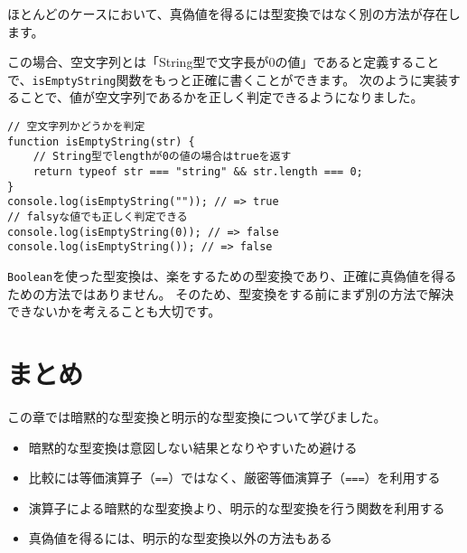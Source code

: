 ほとんどのケースにおいて、真偽値を得るには型変換ではなく別の方法が存在します。

この場合、空文字列とは「String型で文字長が0の値」であると定義することで、\texttt{isEmptyString}関数をもっと正確に書くことができます。
次のように実装することで、値が空文字列であるかを正しく判定できるようになりました。

\begin{lstlisting}
// 空文字列かどうかを判定
function isEmptyString(str) {
    // String型でlengthが0の値の場合はtrueを返す
    return typeof str === "string" && str.length === 0;
}
console.log(isEmptyString("")); // => true
// falsyな値でも正しく判定できる
console.log(isEmptyString(0)); // => false
console.log(isEmptyString()); // => false
\end{lstlisting}

\texttt{Boolean}を使った型変換は、楽をするための型変換であり、正確に真偽値を得るための方法ではありません。
そのため、型変換をする前にまず別の方法で解決できないかを考えることも大切です。

\hypertarget{conclusion}{%
\section{まとめ}\label{conclusion}}

この章では暗黙的な型変換と明示的な型変換について学びました。

\begin{itemize}
\item
  暗黙的な型変換は意図しない結果となりやすいため避ける
\item
  比較には等価演算子（\texttt{==}）ではなく、厳密等価演算子（\texttt{===}）を利用する
\item
  演算子による暗黙的な型変換より、明示的な型変換を行う関数を利用する
\item
  真偽値を得るには、明示的な型変換以外の方法もある
\end{itemize}
